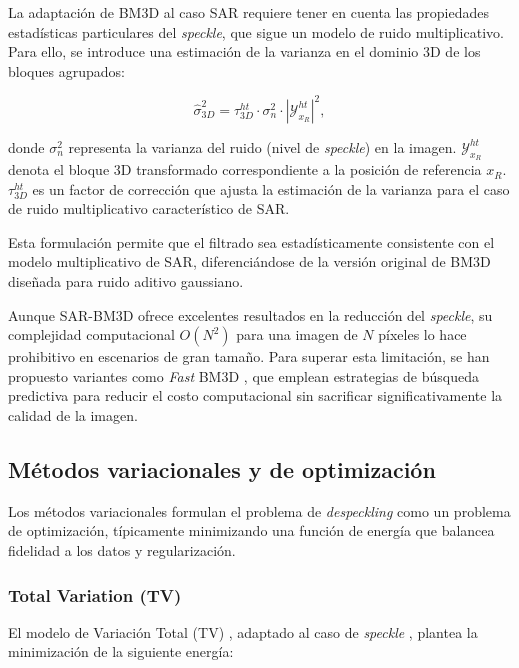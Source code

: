 La adaptación de BM3D al caso SAR requiere tener en cuenta las propiedades estadísticas particulares del \emph{speckle}, que sigue un modelo de ruido multiplicativo. Para ello, se introduce una estimación de la varianza en el dominio 3D de los bloques agrupados:

\begin{equation}
	\hat{\sigma}^2_{3D} = \tau_{3D}^{ht} \cdot \sigma_n^2 \cdot \left|\mathcal{Y}_{x_R}^{ht}\right|^2,
\end{equation}

\vspace{0.3cm}

\noindent donde $\sigma_n^2$ representa la varianza del ruido (nivel de \emph{speckle}) en la imagen. $\mathcal{Y}_{x_R}^{ht}$ denota el bloque 3D transformado correspondiente a la posición de referencia $x_R$. $\tau_{3D}^{ht}$ es un factor de corrección que ajusta la estimación de la varianza para el caso de ruido multiplicativo característico de SAR.

Esta formulación permite que el filtrado sea estadísticamente consistente con el modelo multiplicativo de SAR, diferenciándose de la versión original de BM3D diseñada para ruido aditivo gaussiano.

Aunque SAR-BM3D ofrece excelentes resultados en la reducción del \emph{speckle}, su complejidad computacional $O(N^2)$ para una imagen de $N$ píxeles lo hace prohibitivo en escenarios de gran tamaño. Para superar esta limitación, se han propuesto variantes como \emph{Fast} BM3D \cite{maggioni2012nonlocal}, que emplean estrategias de búsqueda predictiva para reducir el costo computacional sin sacrificar significativamente la calidad de la imagen.

\subsection{Métodos variacionales y de optimización}

Los métodos variacionales formulan el problema de \emph{despeckling} como un problema de optimización, típicamente minimizando una función de energía que balancea fidelidad a los datos y regularización.

\subsubsection{Total Variation (TV)}

El modelo de Variación Total (TV) \cite{rudin1992nonlinear}, adaptado al caso de \emph{speckle} \cite{aubert2008variational}, plantea la minimización de la siguiente energía:

